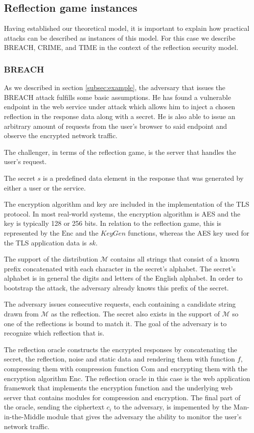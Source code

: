 \documentclass[conference, letterpaper, 10pt]{IEEEtran}
\begin{document}
\subsection{Reflection game instances}
Having established our theoretical model, it is important to explain how
practical attacks can be described as instances of this model. For this case we
describe BREACH, CRIME, and TIME in the context of the reflection security model.

\subsubsection{BREACH}
As we described in section \ref{subsec:example}, the adversary that issues the
BREACH attack fulfills some basic assumptions. He has found a vulnerable
endpoint in the web service under attack which allows him to inject a chosen
reflection in the response data along with a secret. He is also able to issue an
arbitrary amount of requests from the user's browser to said endpoint and
observe the encrypted network traffic.

The challenger, in terms of the reflection game, is the server that handles the
user's request.

The secret $s$ is a predefined data element in the
response that was generated by either a user or the service.

The encryption algorithm and key are included in the implementation of the TLS
protocol. In most real-world systems, the encryption algorithm is AES and the
key is typically 128 or 256 bits. In relation to the reflection game, this is
represented by the $\textrm{Enc}$ and the $KeyGen$ functions, whereas the AES
key used for the TLS application data is $sk$.

The support of the distribution $\mathcal{M}$ contains all strings that consist
of a known prefix concatenated with each character in the secret's alphabet. The
secret's alphabet is in general the digits and letters of the English alphabet.
In order to bootstrap the attack, the adversary already knows this prefix of the
secret.

The adversary issues consecutive requests, each containing a candidate string
drawn from $\mathcal{M}$ as the reflection. The secret also exists in the
support of $\mathcal{M}$ so one of the reflections is bound to match it. The
goal of the adversary is to recognize which reflection that is.

The reflection oracle constructs the encrypted responses by concatenating the
secret, the reflection, noise and static data and rendering them with function
$f$, compressing them with compression function $\textrm{Com}$ and encrypting them with
the encryption algorithm $\textrm{Enc}$. The reflection oracle in this case is the web
application framework that implements the encryption function and the underlying
web server that contains modules for compression and encryption. The final part
of the oracle, sending the ciphertext $c_i$ to the adversary, is impemented by
the Man-in-the-Middle module that gives the adversary the ability to monitor the
user's network traffic.
\end{document}
